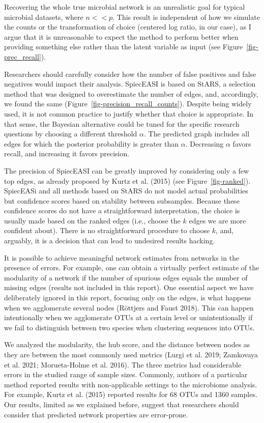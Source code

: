 \documentclass[
  a4paper,
]{article}
\begin{document}
Recovering the whole true microbial network is an unrealistic goal for
typical microbial datasets, where \(n<<p\). This result is independent
of how we simulate the counts or the transformation of choice (centered
log ratio, in our case), as I argue that it is unreasonable to expect
the method to perform better when providing something else rather than
the latent variable as input (see Figure~\ref{fig-prec_recall}).

Researchers should carefully consider how the number of false positives
and false negatives would impact their analysis. SpiecEASI is based on
StARS, a selection method that was designed to overestimate the number
of edges, and, accordingly, we found the same
(Figure~\ref{fig-precision_recall_counts}). Despite being widely used,
it is not common practice to justify whether that choice is appropriate.
In that sense, the Bayesian alternative could be tuned for the specific
research questions by choosing a different threshold \(\alpha\). The
predicted graph includes all edges for which the posterior probability
is greater than \(\alpha\). Decreasing \(\alpha\) favors recall, and
increasing it favors precision.

The precision of SpiecEASI can be greatly improved by considering only a
few top edges, as already proposed by Kurtz et al. (2015) (see
Figure~\ref{fig-ranked}). SpiecEASi and all methods based on StARS do
not model actual probabilities but confidence scores based on stability
between subsamples. Because these confidence scores do not have a
straightforward interpretation, the choice is usually made based on the
ranked edges (i.e., choose the \(k\) edges we are more confident about).
There is no straightforward procedure to choose \(k\), and, arguably, it
is a decision that can lead to undesired results hacking.

It is possible to achieve meaningful network estimates from networks in
the presence of errors. For example, one can obtain a virtually perfect
estimate of the modularity of a network if the number of spurious edges
equals the number of missing edges (results not included in this
report). One essential aspect we have deliberately ignored in this
report, focusing only on the edges, is what happens when we agglomerate
several nodes (Röttjers and Faust 2018). This can happen intentionally
when we agglomerate OTUs at a certain level or unintentionally if we
fail to distinguish between two species when clustering sequences into
OTUs.

We analyzed the modularity, the hub score, and the distance between
nodes as they are between the most commonly used metrics (Lurgi et al.
2019; Zamkovaya et al. 2021; Morueta-Holme et al. 2016). The three
metrics had considerable errors in the studied range of sample sizes.
Commonly, authors of a particular method reported results with
non-applicable settings to the microbiome analysis. For example, Kurtz
et al. (2015) reported results for 68 OTUs and 1360 samples. Our
results, limited as we explained before, suggest that researchers should
consider that predicted network properties are error-prone.
\end{document}
